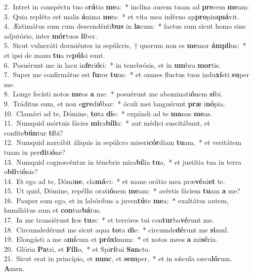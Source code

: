 {2.~}Intret in conspéctu tuo o\textbf{rá}tio \textbf{me}a:~* inclína aurem tuam ad \textbf{pre}cem \textbf{me}am:\\
{3.~}Quia repléta est malis \textbf{á}nima \textbf{me}a:~* et vita mea inférno ap\textbf{pro}pin\textbf{quá}vit.\\
{4.~}Æstimátus sum cum descendénti\textbf{bus} in \textbf{la}cum:~* factus sum sicut homo sine adjutório, inter \textbf{mór}tuos \textbf{li}ber.\\
{5.~}Sicut vulneráti dormiéntes in sepúlcris,~† quorum non es \textbf{me}mor \textbf{ám}\textbf{pli}us:~* et ipsi de manu \textbf{tu}a re\textbf{púl}si sunt.\\
{6.~}Posuérunt me in lacu in\textbf{fe}ri\textbf{ó}ri:~* in tenebrósis, et in \textbf{um}bra \textbf{mor}tis.\\
{7.~}Super me confirmátus est \textbf{fu}ror \textbf{tu}us:~* et omnes fluctus tuos indu\textbf{xí}sti \textbf{su}per me.\\
{8.~}Longe fecísti notos \textbf{me}os \textbf{a} me:~* posuérunt me abominati\textbf{ó}nem \textbf{si}bi.\\
{9.~}Tráditus sum, et non e\textbf{gre}di\textbf{é}bar:~* óculi mei languérunt \textbf{præ} i\textbf{nó}pia.\\
{10.~}Clamávi ad te, Dómine, \textbf{to}ta \textbf{di}e:~* expándi ad te \textbf{ma}nus \textbf{me}as.\\
{11.~}Numquid mórtuis fácies \textbf{mi}ra\textbf{bí}\textbf{li}a:~* aut médici suscitábunt, et confite\textbf{bún}tur \textbf{ti}bi?\\
{12.~}Numquid narrábit áliquis in sepúlcro miseri\textbf{cór}diam \textbf{tu}am,~* et veritátem tuam in per\textbf{di}ti\textbf{ó}ne?\\
{13.~}Numquid cognoscéntur in ténebris mira\textbf{bí}lia \textbf{tu}a,~* et justítia tua in terra o\textbf{bli}vi\textbf{ó}nis?\\
{14.~}Et ego ad te, Dómi\textbf{ne}, cla\textbf{má}vi:~* et mane orátio mea præ\textbf{vé}ni\textbf{et} te.\\
{15.~}Ut quid, Dómine, repéllis orati\textbf{ó}nem \textbf{me}am:~* avértis fáciem \textbf{tu}am \textbf{a} me?\\
{16.~}Pauper sum ego, et in labóribus a juven\textbf{tú}te \textbf{me}a:~* exaltátus autem, humiliátus sum et \textbf{con}tur\textbf{bá}tus.\\
{17.~}In me transiérunt \textbf{i}ræ \textbf{tu}æ:~* et terróres tui con\textbf{tur}ba\textbf{vé}runt me.\\
{18.~}Circumdedérunt me sicut aqua \textbf{to}ta \textbf{di}e:~* circumde\textbf{dé}runt me \textbf{si}mul.\\
{19.~}Elongásti a me a\textbf{mí}cum et \textbf{pró}\textbf{xi}mum:~* et notos meos \textbf{a} mi\textbf{sé}ria.\\
{20.~}Glória \textbf{Pa}tri, et \textbf{Fí}\textbf{li}o,~* et Spi\textbf{rí}tui \textbf{San}cto.\\
{21.~}Sicut erat in princípio, et \textbf{nunc}, et \textbf{sem}per,~* et in sǽcula sæcu\textbf{ló}rum. \textbf{A}men.\\
